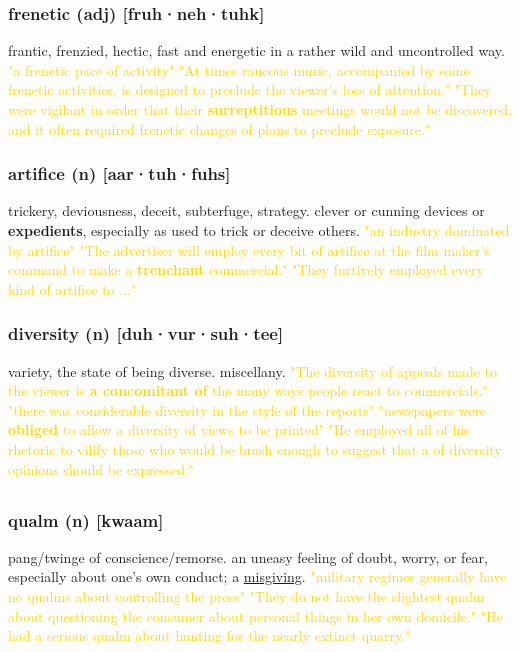 \documentclass{proc}
\begin{document}
	\subsubsection{\textcolor{brickred}{frenetic} (adj) [fruh·neh·tuhk]}
	frantic,
	frenzied,
	hectic, fast and energetic in a rather wild and uncontrolled way.
	\textcolor{gold}{"a frenetic pace of activity" "At times raucous music, accompanied by some frenetic activities, is designed to preclude the viewer's loss of attention." "They were vigilant in order that their \textbf{surreptitious} meetings would not be discovered, and it often required frenetic changes of plans to preclude exposure."}
	
	\subsubsection{\textcolor{brickred}{artifice} (n) [aar·tuh·fuhs]}
	trickery, deviousness, deceit, subterfuge, strategy. clever or cunning devices or \textbf{expedients}, especially as used to trick or deceive others.
	\textcolor{gold}{"an industry dominated by artifice" "The advertiser will employ every bit of artifice at the film maker's command to make a \textbf{trenchant} commercial." "They furtively employed every kind of artifice to ..."}
	
	\subsubsection{\textcolor{brickred}{diversity} (n) [duh·vur·suh·tee]}
	variety, the state of being diverse. miscellany.
	\textcolor{gold}{"The diversity of appeals made to the viewer is \textbf{a concomitant of} the many ways people react to commercials." "there was considerable diversity in the style of the reports" "newspapers were \textbf{obliged} to allow a diversity of views to be printed" "He employed all of his rhetoric to vilify those who would be brash enough to suggest that a of diversity opinions should be expressed."}
	
	\newpage
	\subsection{}
	\subsubsection{\textcolor{brickred}{qualm} (n) [kwaam]}
	pang/twinge of conscience/remorse. an uneasy feeling of doubt, worry, or fear, especially about one's own conduct; a \underline{misgiving}.
	\textcolor{gold}{"military regimes generally have no qualms about controlling the press" "They do not have the slightest qualm about questioning the consumer about personal things in her own domicile." "He had a serious qualm about hunting for the nearly extinct quarry."}
	
\end{document}
